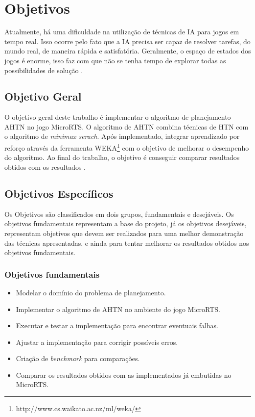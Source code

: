 \chapter{\label{chap:obje}Objetivos}

Atualmente, há uma dificuldade na utilização de técnicas de IA para jogos em tempo real. Isso ocorre pelo fato que a IA precisa ser capaz de resolver tarefas, do mundo real, de maneira rápida e satisfatória. Geralmente, o espaço de estados dos jogos é enorme, isso faz com que não se tenha tempo de explorar todas as possibilidades de solução \cite{millington2009artificial}.   

\section{Objetivo Geral}
O objetivo geral deste trabalho é implementar o algoritmo de planejamento AHTN \cite{ontanon2015adversarial} no jogo MicroRTS. O algoritmo de AHTN combina técnicas de HTN com o algoritmo de \textit{minimax serach}. Após implementado, integrar aprendizado por reforço através da ferramenta WEKA\footnote{http://www.cs.waikato.ac.nz/ml/weka/} com o objetivo de melhorar o desempenho do algoritmo. Ao final do trabalho, o objetivo é conseguir comparar resultados obtidos com os resultados \cite{ontanon2012experiments,hogg2010learning,ontanon2013survey}. 

\section{Objetivos Específicos}\label{obj:esp}
Os Objetivos são classificados em dois grupos, fundamentais e desejáveis. Os objetivos fundamentais representam a base do projeto, já os objetivos desejáveis, representam objetivos que devem ser realizados para uma melhor demonstração das técnicas apresentadas, e ainda para tentar melhorar os resultados obtidos nos objetivos fundamentais. 
 
\subsection{Objetivos fundamentais} 
\begin{itemize}
	\item Modelar o domínio do problema de planejamento.
	\item Implementar o algoritmo de AHTN no ambiente do jogo MicroRTS.
	\item Executar e testar a implementação para encontrar eventuais falhas.
	\item Ajustar a implementação para corrigir possíveis erros.
	\item Criação de \textit{benchmark} para comparações.
	\item Comparar os resultados obtidos com as implementados já embutidas no MicroRTS.
\end{itemize}
 
